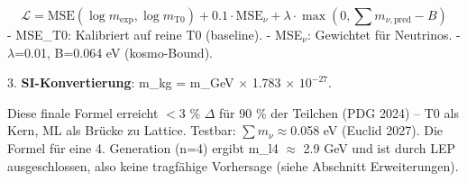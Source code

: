 	\[
	\mathcal{L} = \text{MSE}(\log m_{\exp}, \log m_{\text{T0}}) + 0.1 \cdot \text{MSE}_{\nu} + \lambda \cdot \max(0, \sum m_{\nu, \text{pred}} - B)
	\]
	- MSE\_T0: Kalibriert auf reine T0 (baseline).
	- MSE$_{\nu}$: Gewichtet für Neutrinos.
	- $\lambda$=0.01, B=0.064 eV (kosmo-Bound).
	
	3. \textbf{SI-Konvertierung}: m\_kg = m\_GeV $\times$ 1.783 $\times$ $10^{-27}$.
	
	Diese finale Formel erreicht $<$3 \% $\Delta$ für 90 \% der Teilchen (PDG 2024) – T0 als Kern, ML als Brücke zu Lattice. Testbar: $\sum m_{\nu} \approx$0.058 eV (Euclid 2027). Die Formel für eine 4. Generation (n=4) ergibt m\_l4 $\approx$ 2.9 GeV und ist durch LEP ausgeschlossen, also keine tragfähige Vorhersage (siehe Abschnitt Erweiterungen).
	